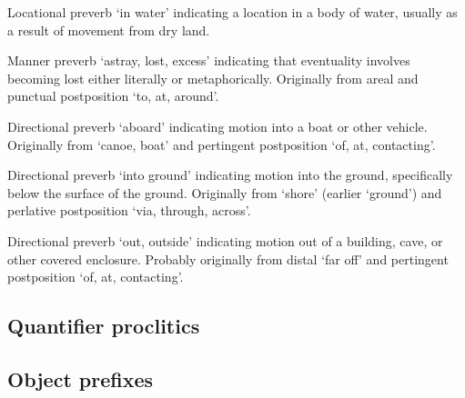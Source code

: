 \begin{morphdesc}
\item[\X{héenx̱=}]
	Locational preverb ‘in water’ indicating a location in a body of water,
		usually as a result of movement from dry land.

\item[\X{ḵáaḵw=}]
\item[\X{ḵáaḵwt=}]

\item[\X{ḵut=}]
	Manner preverb ‘astray, lost, excess’ indicating that eventuality involves becoming lost
		either literally or metaphorically.
	Originally from areal 
		and punctual postposition  ‘to, at, around’.

\item[\X{ḵwáaḵ=}]
\item[\X{ḵwáaḵx̱=}]
\item[\X{ḵwáaḵt=}]

\item[\X{ux̱=}]

\item[\X{yaax̱=}]
	Directional preverb ‘aboard’ indicating motion into a boat or other vehicle.
	Originally from  ‘canoe, boat’
		and pertingent postposition  ‘of, at, contacting’.

\item[\X{ÿanax̱=}]
	Directional preverb ‘into ground’ indicating motion into the ground, specifically
		below the surface of the ground.
	Originally from  ‘shore’ (earlier ‘ground’)
		and perlative postposition  ‘via, through, across’.

\item[\X{yatx̱=}]

\item[\X{yux̱=}]
	Directional preverb ‘out, outside’ indicating motion out of a building, cave,
		or other covered enclosure.
	Probably originally from distal  ‘far off’
		and pertingent postposition  ‘of, at, contacting’.
\end{morphdesc}

\subsection{Quantifier proclitics}\label{sec:inventory-qfr}

\subsection{Object prefixes}\label{sec:inventory-object}

